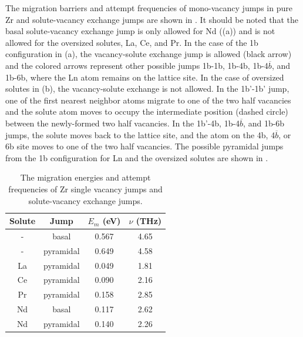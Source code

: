 \documentclass[preprint,12pt]{elsarticle}
\begin{document}
The migration barriers and attempt frequencies of mono-vacancy jumps in pure Zr and solute-vacancy exchange jumps are shown in . It should be noted that the basal solute-vacancy exchange jump is only allowed for Nd ((a)) and is not allowed for the oversized solutes, La, Ce, and Pr. In the case of the 1b configuration in (a), the vacancy-solute exchange jump is allowed (black arrow) and the colored arrows represent other possible jumps 1b-1b, 1b-4b, 1b-4$\overline{b}$, and 1b-6b, where the Ln atom remains on the lattice site. In the case of oversized solutes in (b), the vacancy-solute exchange is not allowed. In the 1b'-1b' jump, one of the first nearest neighbor atoms migrate to one of the two half vacancies and the solute atom moves to occupy the intermediate position (dashed circle) between the newly-formed two half vacancies. In the 1b'-4b, 1b-4$\overline{b}$, and 1b-6b jumps, the solute moves back to the lattice site, and the atom on the 4b, 4$\overline{b}$, or 6b site moves to one of the two half vacancies. The possible pyramidal jumps from the 1b configuration for Ln and the oversized solutes are shown in .

\begin{table}[h!]
    \centering
    \caption{The migration energies and attempt frequencies of Zr single vacancy jumps and solute-vacancy exchange jumps.}
    \begin{tabular}{c|c|c|c}
    \toprule
        Solute & Jump & $E_m$ (eV) & $\nu$ (THz) \\
        \hline
       -  &basal&0.567 & 4.65\\
       - &pyramidal &0.649 & 4.58\\
       \hline
       La&pyramidal &0.049 &1.81 \\
       Ce&pyramidal &0.090 &2.16 \\
       Pr&pyramidal &0.158 &2.85 \\
       Nd&basal &0.117 &2.62 \\
       Nd&pyramidal &0.140 &2.26 \\
       \bottomrule
    \end{tabular}
    \label{tab:jumps}
\end{table}
\end{document}
